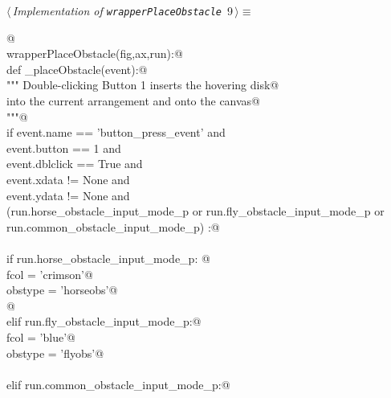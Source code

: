 \documentclass[11.5pt]{report}
\begin{document}
\begin{flushleft} \small\label{scrap9}\raggedright\small
{} $\langle\,${\itshape Implementation of \verb|wrapperPlaceObstacle|}\nobreak\ {\footnotesize {9}}$\,\rangle\equiv$
\vspace{-1ex}
\begin{list}{}{} \item
\mbox{}\verb@   @\\
\mbox{}\verb@def wrapperPlaceObstacle(fig,ax,run):@\\
\mbox{}\verb@        def _placeObstacle(event):@\\
\mbox{}\verb@            """ Double-clicking Button 1 inserts the hovering disk@\\
\mbox{}\verb@                into the current arrangement and onto the canvas@\\
\mbox{}\verb@            """@\\
\mbox{}\verb@            if event.name     == 'button_press_event' and \@\\
\mbox{}\verb@               event.button   == 1                    and \@\\
\mbox{}\verb@               event.dblclick == True                 and \@\\
\mbox{}\verb@               event.xdata    != None                 and \@\\
\mbox{}\verb@               event.ydata    != None                 and \@\\
\mbox{}\verb@               (run.horse_obstacle_input_mode_p or run.fly_obstacle_input_mode_p or run.common_obstacle_input_mode_p) :@\\
\mbox{}\verb@@\\
\mbox{}\verb@                if run.horse_obstacle_input_mode_p: @\\
\mbox{}\verb@                    fcol = 'crimson'@\\
\mbox{}\verb@                    obstype = 'horseobs'@\\
\mbox{}\verb@    @\\
\mbox{}\verb@                elif run.fly_obstacle_input_mode_p:@\\
\mbox{}\verb@                     fcol = 'blue'@\\
\mbox{}\verb@                     obstype = 'flyobs'@\\
\mbox{}\verb@@\\
\mbox{}\verb@                elif run.common_obstacle_input_mode_p:@\\

\end{list}
\end{flushleft}
\end{document}
